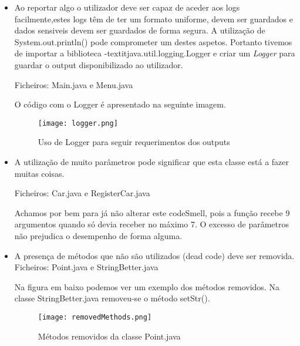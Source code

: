 \begin{itemize}
\item Ao reportar algo o utilizador deve ser capaz de aceder aos logs facilmente,estes logs têm de ter um formato uniforme, devem ser guardados e dados sensiveis devem ser guardados de forma segura. A utilização de System.out.println() pode comprometer um destes aspetos. Portanto tivemos de importar a biblioteca -textit{java.util.logging.Logger} e criar um \textit{Logger} para guardar o output disponibilizado ao utilizador.\newline

 Ficheiros: Main.java e  Menu.java\newline

\par O código com o Logger é apresentado na seguinte imagem.

 \begin{figure}[H]

  \centering

  \texttt{[image: logger.png]}

  \caption {Uso de Logger para seguir requerimentos dos outputs}

  \label {fig13}

\end{figure}
\end{itemize}

\begin{itemize}
\item A utilização de muito parâmetros pode significar que esta classe está a fazer muitas coisas. \newline

Ficheiros: Car.java e RegisterCar.java

\par Achamos por bem para já não alterar este codeSmell, pois a função recebe 9 argumentos quando só devia receber no máximo 7. O excesso de parâmetros não prejudica o desempenho de forma alguma.

\end{itemize}

\begin{itemize}
\item A presença de métodos que não são utilizados (dead code) deve ser removida. \newline
Ficheiros: Point.java e StringBetter.java \newline

\par Na figura em baixo podemos ver um exemplo dos métodos removidos. Na classe StringBetter.java removeu-se o método setStr().
 \begin{figure}[H]

  \centering

  \texttt{[image: removedMethods.png]}

  \caption {Métodos removidos da classe Point.java}

  \label {fig14}

\end{figure}
\end{itemize}

